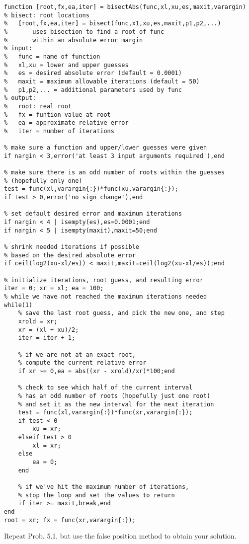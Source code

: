 \documentclass{article}
\begin{document}
\begin{lstlisting}
function [root,fx,ea,iter] = bisectAbs(func,xl,xu,es,maxit,varargin)
% bisect: root locations
%   [root,fx,ea,iter] = bisect(func,x1,xu,es,maxit,p1,p2,...)
%       uses bisection to find a root of func 
%       within an absolute error margin
% input:
%   func = name of function
%   xl,xu = lower and upper guesses
%   es = desired absolute error (default = 0.0001)
%   maxit = maximum allowable iterations (default = 50)
%   p1,p2,... = additional parameters used by func
% output:
%   root: real root
%   fx = funtion value at root
%   ea = approximate relative error
%   iter = number of iterations

% make sure a function and upper/lower guesses were given
if nargin < 3,error('at least 3 input arguments required'),end

% make sure there is an odd number of roots within the guesses
% (hopefully only one)
test = func(xl,varargin{:})*func(xu,varargin{:});
if test > 0,error('no sign change'),end

% set default desired error and maximum iterations
if nargin < 4 | isempty(es),es=0.0001;end
if nargin < 5 | isempty(maxit),maxit=50;end

% shrink needed iterations if possible
% based on the desired absolute error
if ceil(log2(xu-xl/es)) < maxit,maxit=ceil(log2(xu-xl/es));end

% initialize iterations, root guess, and resulting error
iter = 0; xr = xl; ea = 100;
% while we have not reached the maximum iterations needed
while(1)
    % save the last root guess, and pick the new one, and step
    xrold = xr;
    xr = (xl + xu)/2;
    iter = iter + 1;
    
    % if we are not at an exact root,
    % compute the current relative error
    if xr ~= 0,ea = abs((xr - xrold)/xr)*100;end
    
    % check to see which half of the current interval
    % has an odd number of roots (hopefully just one root)
    % and set it as the new interval for the next iteration
    test = func(xl,varargin{:})*func(xr,varargin{:});
    if test < 0
        xu = xr;
    elseif test > 0
        xl = xr;
    else
        ea = 0;
    end
    
    % if we've hit the maximum number of iterations,
    % stop the loop and set the values to return
    if iter >= maxit,break,end
end
root = xr; fx = func(xr,varargin{:});
\end{lstlisting}

\begin{problem}

	Repeat Prob. 5.1, but use the false position method to obtain your solution.
	
\end{problem}
\end{document}
